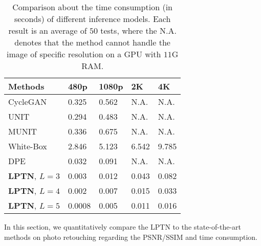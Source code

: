 \documentclass[10pt,twocolumn,letterpaper]{article}
\begin{document}
	\begin{table}[t]
		\caption{Comparison about the time consumption (in seconds) of different inference models. Each result is an average of $50$ tests, where the N.A. denotes that the method cannot handle the image of specific resolution on a GPU with $11$G RAM.
		}
		\vspace{-1.2em}
		\small
		\label{time_comparison}
		\begin{center}
			\begin{tabular}{p{2.3cm}p{1cm}<{\centering}p{1cm}<{\centering}p{1cm}<{\centering}p{1cm}<{\centering}}
				\toprule
				Methods&480p&1080p&2K&4K\\
				\midrule
				CycleGAN~\cite{zhu2017unpaired}  &0.325&0.562&N.A.&N.A. \\
				UNIT~\cite{liu2017unsupervised} &0.294&0.483&N.A.&N.A. \\
				MUNIT~\cite{huang2018multimodal} &0.336&0.675&N.A.&N.A. \\
				White-Box~\cite{hu2018exposure} &2.846&5.123&6.542&9.785 \\
				DPE \cite{chen2018deep}&0.032&0.091&N.A.&N.A. \\
				\midrule
				\textbf{LPTN}, $ L=3 $ &0.003&0.012&0.043&0.082 \\
				\textbf{LPTN}, $ L=4 $ &0.002&0.007&0.015&0.033 \\
				\textbf{LPTN}, $ L=5 $ &0.0008&0.005&0.011&0.016 \\
				\bottomrule
			\end{tabular}
		\end{center}
	\end{table}
	
		
	In this section, we quantitatively compare the LPTN to the state-of-the-art methods on photo retouching regarding the PSNR/SSIM and time consumption.
	
\end{document}
